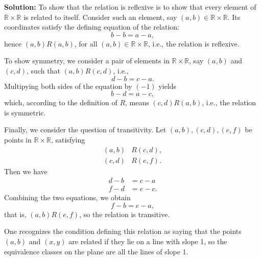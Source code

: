 \documentclass[12pt,oneside]{exam}
\newenvironment{newsolution}{\vspace{.1in}\noindent\textbf{Solution: \hspace{.05em}}}{}
\begin{document}
\begin{newsolution}
To show that the relation is reflexive is to show that every element of $\mathbb{R} \times \mathbb{R}$ is related to itself. Consider such an element, say $(a,b) \in \mathbb{R} \times \mathbb{R}$. Its coordinates satisfy the defining equation of the relation:
\begin{equation*}
b-b=a-a,
\end{equation*}
hence $(a,b)R(a,b)$, for all $(a,b) \in \mathbb{R}\times \mathbb{R}$, i.e., the relation is reflexive. 

To show symmetry, we consider a pair of elements in $\mathbb{R}\times \mathbb{R}$, say $(a,b)$ and $(c,d)$, such that $(a,b)R(c,d)$, i.e., 
\begin{equation*}
d-b=c-a.
\end{equation*}
Multipying both sides of the equation by $(-1)$ yields
\begin{equation*}
b-d=a-c,
\end{equation*}
which, according to the definition of $R$, means $(c,d) R (a,b)$, i.e., the relation is symmetric. 

Finally, we consider the question of transitivity. Let $(a,b), (c,d), (e,f)$ be points in $\mathbb{R} \times \mathbb{R}$, satisfying 
\begin{align*} 
(a,b) & R (c,d),\\
(c,d) & R (e,f).
\end{align*}
Then we have 
\begin{align*}
d-b & = c- a\\
f-d & = e-c.
\end{align*}
Combining the two equations, we obtain 
\begin{equation*}
f-b=e-a,
\end{equation*}
that is, $(a,b)R(e,f)$, so the relation is transitive. 

One recognizes the condition defining this relation as saying that the points $(a,b)$ and $(x,y)$ are related if they lie on a line with slope 1, so the equivalence classes on the plane are all the lines of slope 1. 
\end{newsolution}
\end{document}
